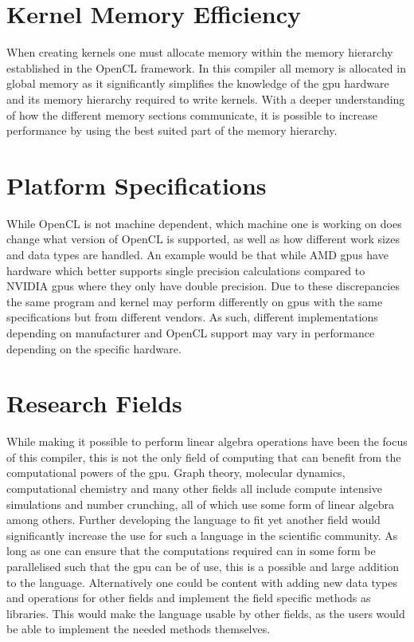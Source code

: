 \section{Kernel Memory Efficiency}
When creating kernels one must allocate memory within the memory hierarchy established in the OpenCL framework. 
In this compiler all memory is allocated in global memory as it significantly simplifies the knowledge of the \acrshort{gpu} hardware and its memory hierarchy required to write kernels.
With a deeper understanding of how the different memory sections communicate, it is possible to increase performance by using the best suited part of the memory hierarchy. \citep{ocl_lecture3}

\section{Platform Specifications}
While OpenCL is not machine dependent, which machine one is working on does change what version of OpenCL is supported, as well as how different work sizes and data types are handled.
An example would be that while AMD \acrshort{gpu}s have hardware which better supports single precision calculations compared to NVIDIA \acrshort{gpu}s where they only have double precision. \citep{CUDAOpenCLOptimisation}
Due to these discrepancies the same program and kernel may perform differently on \acrshort{gpu}s with the same specifications but from different vendors.
As such, different implementations depending on manufacturer and OpenCL support may vary in performance depending on the specific hardware.

\section{Research Fields}
While making it possible to perform linear algebra operations have been the focus of this compiler, this is not the only field of computing that can benefit from the computational powers of the \acrshort{gpu}.
Graph theory, molecular dynamics, computational chemistry and many other fields all include compute intensive simulations and number crunching, all of which use some form of linear algebra among others.
Further developing the language to fit yet another field would significantly increase the use for such a language in the scientific community.
As long as one can ensure that the computations required can in some form be parallelised such that the \acrshort{gpu} can be of use, this is a possible and large addition to the language.
Alternatively one could be content with adding new data types and operations for other fields and implement the field specific methods as libraries.
This would make the language usable by other fields, as the users would be able to implement the needed methods themselves.